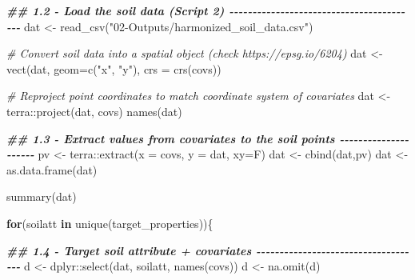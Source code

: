 \documentclass[
  10pt,
  b5paper,
  oneside]{book}
\newenvironment{Shaded}{\begin{snugshade}}{\end{snugshade}}
\newcommand{\AttributeTok}[1]{\textcolor[rgb]{0.77,0.63,0.00}{#1}}
\newcommand{\CommentTok}[1]{\textcolor[rgb]{0.56,0.35,0.01}{\textit{#1}}}
\newcommand{\ControlFlowTok}[1]{\textcolor[rgb]{0.13,0.29,0.53}{\textbf{#1}}}
\newcommand{\DocumentationTok}[1]{\textcolor[rgb]{0.56,0.35,0.01}{\textbf{\textit{#1}}}}
\newcommand{\FunctionTok}[1]{\textcolor[rgb]{0.00,0.00,0.00}{#1}}
\newcommand{\NormalTok}[1]{#1}
\newcommand{\OtherTok}[1]{\textcolor[rgb]{0.56,0.35,0.01}{#1}}
\newcommand{\SpecialCharTok}[1]{\textcolor[rgb]{0.00,0.00,0.00}{#1}}
\newcommand{\StringTok}[1]{\textcolor[rgb]{0.31,0.60,0.02}{#1}}
\begin{document}
\begin{Shaded}
\begin{Highlighting}[]
\DocumentationTok{\#\# 1.2 {-} Load the soil data (Script 2) {-}{-}{-}{-}{-}{-}{-}{-}{-}{-}{-}{-}{-}{-}{-}{-}{-}{-}{-}{-}{-}{-}{-}{-}{-}{-}{-}{-}{-}{-}{-}{-}{-}{-}{-}{-}{-}{-}{-}{-}{-}}
\NormalTok{dat }\OtherTok{\textless{}{-}} \FunctionTok{read\_csv}\NormalTok{(}\StringTok{"02{-}Outputs/harmonized\_soil\_data.csv"}\NormalTok{)}

\CommentTok{\# Convert soil data into a spatial object (check https://epsg.io/6204)}
\NormalTok{dat }\OtherTok{\textless{}{-}} \FunctionTok{vect}\NormalTok{(dat, }\AttributeTok{geom=}\FunctionTok{c}\NormalTok{(}\StringTok{"x"}\NormalTok{, }\StringTok{"y"}\NormalTok{), }\AttributeTok{crs =} \FunctionTok{crs}\NormalTok{(covs))}

\CommentTok{\# Reproject point coordinates to match coordinate system of covariates}
\NormalTok{dat }\OtherTok{\textless{}{-}}\NormalTok{ terra}\SpecialCharTok{::}\FunctionTok{project}\NormalTok{(dat, covs)}
\FunctionTok{names}\NormalTok{(dat)}

\DocumentationTok{\#\# 1.3 {-} Extract values from covariates to the soil points {-}{-}{-}{-}{-}{-}{-}{-}{-}{-}{-}{-}{-}{-}{-}{-}{-}{-}{-}{-}{-}}
\NormalTok{pv }\OtherTok{\textless{}{-}}\NormalTok{ terra}\SpecialCharTok{::}\FunctionTok{extract}\NormalTok{(}\AttributeTok{x =}\NormalTok{ covs, }\AttributeTok{y =}\NormalTok{ dat, }\AttributeTok{xy=}\NormalTok{F)}
\NormalTok{dat }\OtherTok{\textless{}{-}} \FunctionTok{cbind}\NormalTok{(dat,pv)}
\NormalTok{dat }\OtherTok{\textless{}{-}} \FunctionTok{as.data.frame}\NormalTok{(dat)}

\FunctionTok{summary}\NormalTok{(dat)}



\ControlFlowTok{for}\NormalTok{(soilatt }\ControlFlowTok{in} \FunctionTok{unique}\NormalTok{(target\_properties))\{}


\DocumentationTok{\#\# 1.4 {-} Target soil attribute + covariates {-}{-}{-}{-}{-}{-}{-}{-}{-}{-}{-}{-}{-}{-}{-}{-}{-}{-}{-}{-}{-}{-}{-}{-}{-}{-}{-}{-}{-}{-}{-}{-}{-}{-}{-}{-}}
\NormalTok{d }\OtherTok{\textless{}{-}}\NormalTok{ dplyr}\SpecialCharTok{::}\FunctionTok{select}\NormalTok{(dat, soilatt, }\FunctionTok{names}\NormalTok{(covs))}
\NormalTok{d }\OtherTok{\textless{}{-}} \FunctionTok{na.omit}\NormalTok{(d)}


\end{Highlighting}
\end{Shaded}
\end{document}
